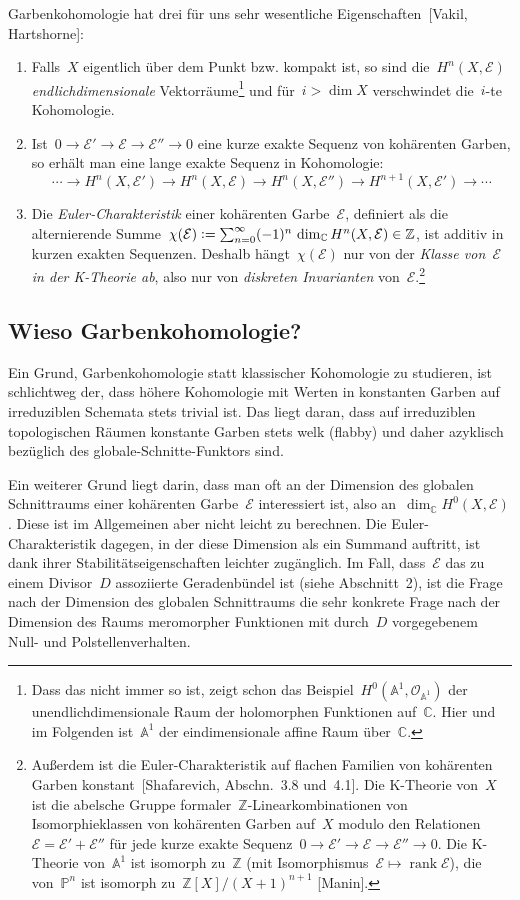 \documentclass[a4paper,ngerman,12pt]{scrartcl}
\theoremstyle{definition}
\theoremstyle{plain}
\theoremstyle{remark}
\renewcommand{\AA}{\mathbb{A}}
\newcommand{\CC}{\mathbb{C}}
\newcommand{\ZZ}{\mathbb{Z}}
\newcommand{\PP}{\mathbb{P}}
\newcommand{\E}{\mathcal{E}}
\renewcommand{\O}{\mathcal{O}}
\newcommand{\rank}{\operatorname{rank}}
\newcommand{\lra}{\longrightarrow}
\newcommand{\defeq}{\vcentcolon=}
\begin{document}
Garbenkohomologie hat drei für uns sehr wesentliche Eigenschaften~[Vakil,
Hartshorne]:
\begin{enumerate}
\item Falls~$X$ eigentlich über dem Punkt bzw. kompakt ist, so sind
die~$H^n(X,\E)$ \emph{endlichdimensionale} Vektorräume\footnote{Dass das
nicht immer so ist, zeigt schon das Beispiel~$H^0(\AA^1, \O_{\AA^1})$ der
unendlichdimensionale Raum der holomorphen Funktionen auf~$\CC$. Hier und im
Folgenden ist~$\AA^1$ der eindimensionale affine Raum über~$\CC$.} und für~$i > \dim X$
verschwindet die~$i$-te Kohomologie.
\item Ist~$0 \to \E' \to \E \to \E'' \to 0$ eine kurze exakte Sequenz von
kohärenten Garben, so erhält man eine lange exakte Sequenz in Kohomologie:
\[ \cdots \lra H^n(X,\E') \lra H^n(X,\E) \lra H^n(X,\E'') \lra H^{n+1}(X,\E')
\lra \cdots \]
\item Die \emph{Euler-Charakteristik} einer kohärenten Garbe~$\E$, definiert
als die alternierende Summe~$\chi(\E) \defeq \sum_{n=0}^\infty (-1)^n\, \dim_\CC H^n(X,\E)
\in \ZZ$, ist additiv in kurzen exakten Sequenzen. Deshalb hängt~$\chi(\E)$ nur
von der \emph{Klasse von~$\E$ in der K-Theorie ab}, also nur von
\emph{diskreten Invarianten} von~$\E$.\footnote{Außerdem ist die
Euler-Charakteristik auf flachen Familien von kohärenten Garben
konstant~[Shafarevich, Abschn.~3.8 und~4.1].
Die K-Theorie von~$X$ ist die abelsche Gruppe
formaler~$\ZZ$-Linearkombinationen von Isomorphieklassen von kohärenten Garben
auf~$X$ modulo den Relationen~$\E = \E' + \E''$ für jede kurze exakte
Sequenz~$0 \to \E' \to \E \to \E'' \to 0$.  Die K-Theorie von~$\AA^1$ ist
isomorph zu~$\ZZ$ (mit Isomorphismus~$\E \mapsto \rank\E$), die von~$\PP^n$ ist
isomorph zu~$\ZZ[X]/(X+1)^{n+1}$ [Manin].}
\end{enumerate}


\subsection*{Wieso Garbenkohomologie?}

Ein Grund, Garbenkohomologie statt klassischer Kohomologie zu studieren, ist
schlichtweg der, dass höhere Kohomologie mit Werten in konstanten Garben auf
irreduziblen Schemata stets trivial ist. Das liegt daran, dass auf irreduziblen
topologischen Räumen konstante Garben stets welk (flabby) und daher azyklisch
bezüglich des globale-Schnitte-Funktors sind.

Ein weiterer Grund liegt darin, dass man oft an der Dimension des globalen
Schnitt\-raums einer kohärenten Garbe~$\E$ interessiert ist, also an~$\dim_\CC
H^0(X,\E)$. Diese ist im Allgemeinen aber nicht leicht zu berechnen. Die
Euler-Charakteristik dagegen, in der diese Dimension als ein Summand auftritt,
ist dank ihrer Stabilitätseigenschaften leichter zugänglich. Im Fall, dass~$\E$
das zu einem Divisor~$D$ assoziierte Geradenbündel ist (siehe Abschnitt~2), ist
die Frage nach der Dimension des globalen Schnittraums die sehr konkrete Frage
nach der Dimension des Raums meromorpher Funktionen mit durch~$D$ vorgegebenem
Null- und Polstellenverhalten.
\end{document}
